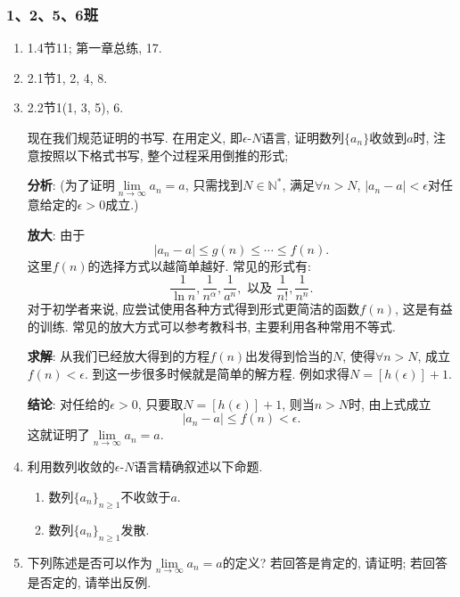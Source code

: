 \documentclass[UTF8,11pt, a4paper, oneside, fontset=none]{ctexbook}
\begin{document}
\subsubsection*{1、2、5、6班}
\begin{enumerate}
\item 1.4节11; 第一章总练, 17.
\item 2.1节1, 2, 4, 8.
\item 2.2节1(1, 3, 5), 6.

\begin{tcolorbox}
现在我们规范证明的书写. 在用定义, 即$\epsilon$-$N$语言, 证明数列$\{ a_n\}$收敛到$a$时, 注意按照以下格式书写, 整个过程采用倒推的形式;

\noindent
{\bf 分析}: (为了证明$\lim\limits_{n \to \infty} a_n = a$, 只需找到$N \in \mathbb N^*$, 满足$\forall n >N$, $|a_n -a|< \epsilon$对任意给定的$\epsilon >0$成立.)

\noindent
{\bf 放大}: 由于
\[
|a_n - a|\leq g(n) \leq \cdots \leq f(n).
\]
这里$f(n)$的选择方式以越简单越好. 常见的形式有:
\[
\frac{1}{\ln n}, \frac{1}{n^{\alpha}}, \frac{1}{a^n},  \mbox{ 以及 \ } \frac{1}{n!}, \frac{1}{n^n}.
\]
对于初学者来说, 应尝试使用各种方式得到形式更简洁的函数$f(n)$, 这是有益的训练. 常见的放大方式可以参考教科书, 主要利用各种常用不等式.

\noindent
{\bf 求解}: 从我们已经放大得到的方程$f(n) $出发得到恰当的$N$, 使得$\forall n > N$, 成立$f(n) < \epsilon$. 到这一步很多时候就是简单的解方程. 例如求得$N = [h(\epsilon)]+1$.

\noindent
{\bf 结论}:  对任给的$\epsilon >0$, 只要取$N = [h(\epsilon)]+1$, 则当$n >N$时, 由上式成立
\[
|a_n - a| \leq f(n) < \epsilon.
\]
这就证明了$\lim\limits_{n \to \infty} a_n = a$.

\end{tcolorbox}

\item 利用数列收敛的$\epsilon$-$N$语言精确叙述以下命题.
\begin{enumerate}
\item 数列$\{a_n \}_{n \geq 1}$不收敛于$a$.

\item 数列$\{a_n \}_{n \geq 1}$发散.
\end{enumerate}

\item 下列陈述是否可以作为$\lim\limits_{n \to \infty} a_n = a$的定义? 若回答是肯定的, {\color{red}请证明}; 若回答是否定的, {\color{red}请举出反例}.


\end{enumerate}
\end{document}
